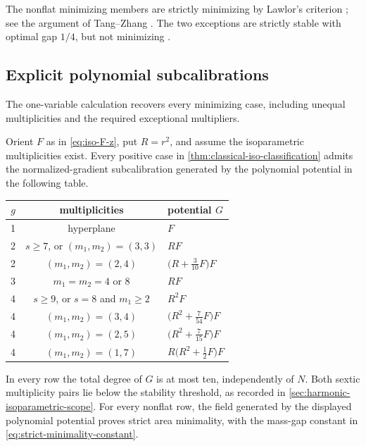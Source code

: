 The nonflat minimizing members are strictly minimizing by Lawlor's criterion
\cite[Section~4.3]{Lawlor91}; see the argument of Tang--Zhang
\cite[Section~2]{TangZhang20}.
The two exceptions are strictly stable with optimal gap \(1/4\),
but not minimizing \cite[Theorem~B, p.~238]{Wang94}.



\subsection{Explicit polynomial subcalibrations}
\label{sec:isoparametric-certificates}

The one-variable calculation recovers every minimizing case, including
unequal multiplicities and the required exceptional multipliers.

\begin{theorem}
\label{thm:iso-polynomial-table}
Orient \(F\) as in \eqref{eq:iso-F-z}, put \(R=r^2\), and assume the
isoparametric multiplicities exist.  Every positive case in
\cref{thm:classical-iso-classification} admits the normalized-gradient
subcalibration generated by the polynomial potential in the following table.
\begin{center}
\renewcommand{\arraystretch}{1.18}
\begin{tabular}{@{}ccl@{}}
\toprule
\(g\)&multiplicities&potential \(G\)\\
\midrule
1&hyperplane&\(F\)\\
2&\(s\geq7\), or \((m_1,m_2)=(3,3)\)&\(RF\)\\
2&\((m_1,m_2)=(2,4)\)&\(\bigl(R+\frac3{10}F\bigr)F\)\\
3&\(m_1=m_2=4\) or \(8\)&\(RF\)\\
4&\(s\geq9\), or \(s=8\) and \(m_1\geq2\)&\(R^2F\)\\
4&\((m_1,m_2)=(3,4)\)&\(\bigl(R^2+\frac7{54}F\bigr)F\)\\
4&\((m_1,m_2)=(2,5)\)&\(\bigl(R^2+\frac7{15}F\bigr)F\)\\
4&\((m_1,m_2)=(1,7)\)&\(R\bigl(R^2+\frac12F\bigr)F\)\\
\bottomrule
\end{tabular}
\end{center}
In every row the total degree of \(G\) is at most ten, independently
of \(N\). Both sextic multiplicity pairs lie below the stability
threshold, as recorded in \cref{sec:harmonic-isoparametric-scope}.
For every nonflat row, the field generated by the displayed polynomial potential proves strict
area minimality, with the mass-gap constant in
\eqref{eq:strict-minimality-constant}.
\end{theorem}
